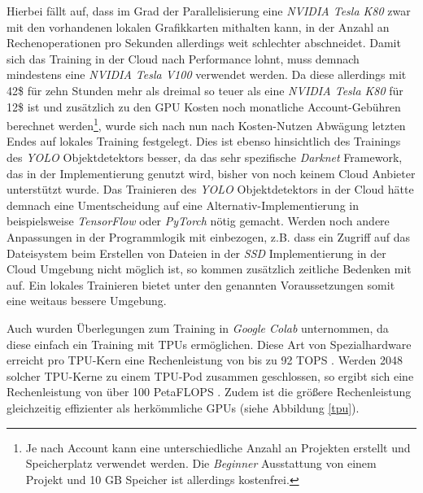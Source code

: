Hierbei fällt auf, dass im Grad der Parallelisierung eine \textit{NVIDIA Tesla K80} zwar mit den vorhandenen lokalen Grafikkarten mithalten kann, in der Anzahl an Rechenoperationen pro Sekunden allerdings weit schlechter abschneidet. Damit sich das Training in der Cloud nach Performance lohnt, muss demnach mindestens eine \textit{NVIDIA Tesla V100} verwendet werden. Da diese allerdings mit 42\$ für zehn Stunden mehr als dreimal so teuer als eine \textit{NVIDIA Tesla K80} für 12\$ ist und zusätzlich zu den GPU Kosten noch monatliche Account-Gebühren berechnet werden\footnote{Je nach Account kann eine unterschiedliche Anzahl an Projekten erstellt und Speicherplatz verwendet werden. Die \textit{Beginner} Ausstattung von einem Projekt und 10 GB Speicher ist allerdings kostenfrei.}, wurde sich nach nun nach Kosten-Nutzen Abwägung letzten Endes auf lokales Training festgelegt. Dies ist ebenso hinsichtlich des Trainings des \textit{YOLO} Objektdetektors besser, da das sehr spezifische \textit{Darknet} Framework, das in der Implementierung genutzt wird, bisher von noch keinem Cloud Anbieter unterstützt wurde. Das Trainieren des \textit{YOLO} Objektdetektors in der Cloud hätte demnach eine Umentscheidung auf eine Alternativ-Implementierung in beispielsweise \textit{TensorFlow} oder \textit{PyTorch} nötig gemacht. Werden noch andere Anpassungen in der Programmlogik mit einbezogen, z.B. dass ein Zugriff auf das Dateisystem beim Erstellen von Dateien in der \textit{SSD} Implementierung in der Cloud Umgebung nicht möglich ist, so kommen zusätzlich zeitliche Bedenken mit auf. Ein lokales Trainieren bietet unter den genannten Voraussetzungen somit eine weitaus bessere Umgebung.

Auch wurden Überlegungen zum Training in \textit{Google Colab} unternommen, da diese einfach ein Training mit TPUs ermöglichen. Diese Art von Spezialhardware erreicht pro TPU-Kern eine Rechenleistung von bis zu 92 TOPS \cite{HaraldBogeholz.20170406}. Werden 2048 solcher TPU-Kerne zu einem TPU-Pod zusammen geschlossen, so ergibt sich eine Rechenleistung von über 100 PetaFLOPS \cite{GoogleCloud.20200209}. Zudem ist die größere Rechenleistung gleichzeitig effizienter als herkömmliche GPUs (siehe Abbildung \ref{tpu}).

